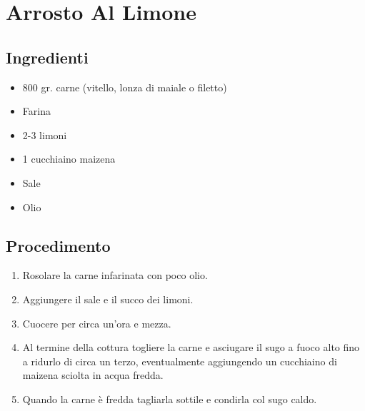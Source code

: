 \section{Arrosto Al Limone}
\subsection{Ingredienti}
\begin{itemize}
\item 800 gr. carne (vitello, lonza di maiale o filetto)  
\item Farina  
\item 2-3 limoni  
\item 1 cucchiaino maizena  
\item Sale  
\item Olio
\end{itemize}
\subsection{Procedimento}
\begin{enumerate}
\item  Rosolare la carne infarinata con poco olio.  
\item  Aggiungere il sale e il succo dei limoni.   
\item  Cuocere per circa un'ora e mezza.  
\item  Al termine della cottura togliere la carne e asciugare il sugo a fuoco alto fino a ridurlo di circa un terzo, eventualmente aggiungendo un cucchiaino di maizena sciolta in acqua fredda.  
\item  Quando la carne è fredda tagliarla sottile e condirla col sugo caldo.
\end{enumerate}
